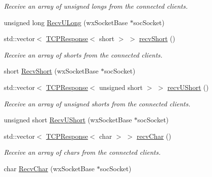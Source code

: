 \begin{DoxyCompactItemize}
\begin{DoxyCompactList}\small\item\em Receive an array of unsigned longs from the connected clients. \end{DoxyCompactList}\item 
unsigned long \hyperlink{class_rad_j_a_v_1_1_networking_1_1wx_widgets_t_c_p_server_a5ed7e7f894f05987dc9801eed98235e2}{Recv\+U\+Long} (wx\+Socket\+Base $\ast$soc\+Socket)
\item 
std\+::vector$<$ \hyperlink{class_rad_j_a_v_1_1_networking_1_1_t_c_p_response}{T\+C\+P\+Response}$<$ short $>$ $>$ \hyperlink{class_rad_j_a_v_1_1_networking_1_1wx_widgets_t_c_p_server_a28d61fa54cb79db09a4877832e3488ed}{recv\+Short} ()
\begin{DoxyCompactList}\small\item\em Receive an array of shorts from the connected clients. \end{DoxyCompactList}\item 
short \hyperlink{class_rad_j_a_v_1_1_networking_1_1wx_widgets_t_c_p_server_a9ffb0da4edac465b8e4d1ee8c5f3cd18}{Recv\+Short} (wx\+Socket\+Base $\ast$soc\+Socket)
\item 
std\+::vector$<$ \hyperlink{class_rad_j_a_v_1_1_networking_1_1_t_c_p_response}{T\+C\+P\+Response}$<$ unsigned short $>$ $>$ \hyperlink{class_rad_j_a_v_1_1_networking_1_1wx_widgets_t_c_p_server_ad7440dbd5ac95f86a7da35306af67174}{recv\+U\+Short} ()
\begin{DoxyCompactList}\small\item\em Receive an array of unsigned shorts from the connected clients. \end{DoxyCompactList}\item 
unsigned short \hyperlink{class_rad_j_a_v_1_1_networking_1_1wx_widgets_t_c_p_server_a5ffedb767253cf86eff27accd77b5a6f}{Recv\+U\+Short} (wx\+Socket\+Base $\ast$soc\+Socket)
\item 
std\+::vector$<$ \hyperlink{class_rad_j_a_v_1_1_networking_1_1_t_c_p_response}{T\+C\+P\+Response}$<$ char $>$ $>$ \hyperlink{class_rad_j_a_v_1_1_networking_1_1wx_widgets_t_c_p_server_ae964ef6ac1547ac313d8ab580ae3f7b4}{recv\+Char} ()
\begin{DoxyCompactList}\small\item\em Receive an array of chars from the connected clients. \end{DoxyCompactList}\item 
char \hyperlink{class_rad_j_a_v_1_1_networking_1_1wx_widgets_t_c_p_server_a253113c833bf5ac8a384de6d2c61684d}{Recv\+Char} (wx\+Socket\+Base $\ast$soc\+Socket)

\end{DoxyCompactItemize}
